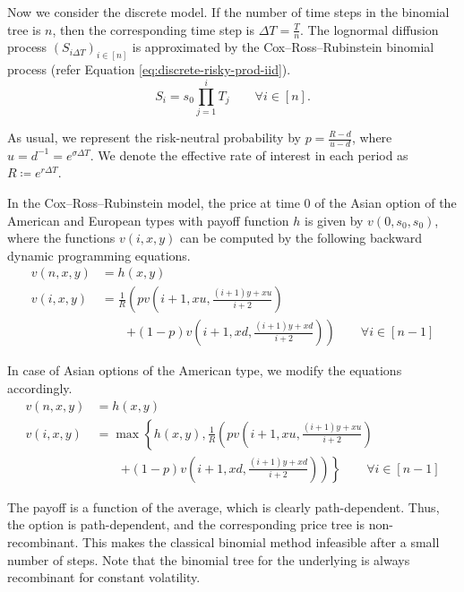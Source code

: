Now we consider the discrete model. If the number of time steps in the binomial tree is $ n $, then the corresponding time step is $ \Delta T = \frac{T}{n} $. The lognormal diffusion process $ (S_{i \Delta T})_{i \in [n]} $ is approximated by the Cox–Ross–Rubinstein binomial process (refer Equation \ref{eq:discrete-risky-prod-iid}).
\begin{equation*}
	S_i = s_0 \prod_{j=1}^{i} T_j  \qquad  \forall i \in [n] .
\end{equation*}

As usual, we represent the risk-neutral probability by $ p = \frac{R - d}{u - d} $, where $ u = d^{-1} = e^{\sigma \Delta T} $. We denote the effective rate of interest in each period as $ R \coloneqq e^{r \Delta T} $.

In the Cox–Ross–Rubinstein model, the price at time 0 of the Asian option of the American and European types with payoff function $ h $ is given by $ v(0, s_0, s_0) $, where the functions $ v(i, x, y) $ can be computed by the following backward dynamic programming equations.
\begin{subequations}
	\label{eq:asian-dp-eu}
	\begin{align}
		v(n, x, y)  &=  h(x,y)  \\
		v(i, x, y)  &=  \frac{1}{R} \left(  p v \left( i + 1, x u, \frac{(i + 1) y + x u}{i + 2} \right)  \right.  \\
		&  \qquad  \left. + (1-p) v \left( i + 1, x d, \frac{(i + 1) y + x d}{i + 2} \right)  \right)  \qquad   \forall i \in [n - 1]  \nonumber
	\end{align}
\end{subequations}

In case of Asian options of the American type, we modify the equations accordingly.
\begin{subequations}
	\label{eq:asian-dp-am}
	\begin{align}
		v(n, x, y)  &=  h(x,y)  \\
		v(i, x, y)  &=  \max \left\lbrace  h(x, y), \frac{1}{R} \left(  p v \left( i + 1, x u, \frac{(i + 1) y + x u}{i + 2} \right)  \right. \right. \\
		&  \qquad  \left. \left. + (1-p) v \left( i + 1, x d, \frac{(i + 1) y + x d}{i + 2} \right)  \right)  \right\rbrace  \qquad  \forall i \in [n - 1]  \nonumber
	\end{align}
\end{subequations}

The payoff is a function of the average, which is clearly path-dependent. Thus, the option is path-dependent, and the corresponding price tree is non-recombinant. This makes the classical binomial method infeasible after a small number of steps. Note that the binomial tree for the underlying is always recombinant for constant volatility.


